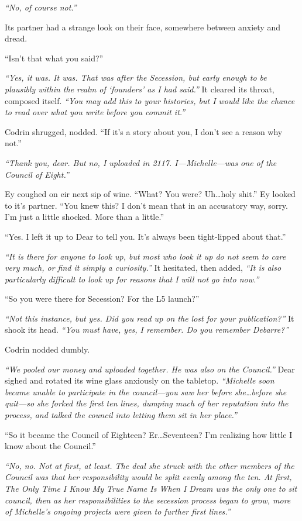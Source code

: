 \emph{``No, of course not.''}

Its partner had a strange look on their face, somewhere between anxiety and dread.

``Isn't that what you said?''

\emph{``Yes, it was. It was. That was after the Secession, but early enough to be plausibly within the realm of `founders' as I had said.''} It cleared its throat, composed itself. \emph{``You may add this to your histories, but I would like the chance to read over what you write before you commit it.''}

Codrin shrugged, nodded. ``If it's a story about you, I don't see a reason why not.''

\emph{``Thank you, dear. But no, I uploaded in 2117. I---Michelle---was one of the Council of Eight.''}

Ey coughed on eir next sip of wine. ``What? You were? Uh\ldots holy shit.'' Ey looked to it's partner. ``You knew this? I don't mean that in an accusatory way, sorry. I'm just a little shocked. More than a little.''

``Yes. I left it up to Dear to tell you. It's always been tight-lipped about that.''

\emph{``It is there for anyone to look up, but most who look it up do not seem to care very much, or find it simply a curiosity.''} It hesitated, then added, \emph{``It is also particularly difficult to look up for reasons that I will not go into now.''}

``So you were there for Secession? For the L5 launch?''

\emph{``Not this instance, but yes. Did you read up on the lost for your publication?''} It shook its head. \emph{``You must have, yes, I remember. Do you remember Debarre?''}

Codrin nodded dumbly.

\emph{``We pooled our money and uploaded together. He was also on the Council.''} Dear sighed and rotated its wine glass anxiously on the tabletop. \emph{``Michelle soon became unable to participate in the council---you saw her before she\ldots before she quit---so she forked the first ten lines, dumping much of her reputation into the process, and talked the council into letting them sit in her place.''}

``So it became the Council of Eighteen? Er\ldots Seventeen? I'm realizing how little I know about the Council.''

\emph{``No, no. Not at first, at least. The deal she struck with the other members of the Council was that her responsibility would be split evenly among the ten. At first, The Only Time I Know My True Name Is When I Dream was the only one to sit council, then as her responsibilities to the secession process began to grow, more of Michelle's ongoing projects were given to further first lines.''}

